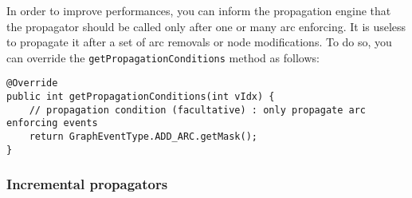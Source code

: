 \documentclass{article}
\begin{document}
In order to improve performances, you can inform the propagation engine that the propagator should be called only after one or many arc enforcing. It is useless to propagate it after a set of arc removals or node modifications. 
To do so, you can override the \texttt{getPropagationConditions} method as follows:
\begin{lstlisting}
@Override
public int getPropagationConditions(int vIdx) {
	// propagation condition (facultative) : only propagate arc enforcing events
	return GraphEventType.ADD_ARC.getMask();
}
\end{lstlisting}

\subsubsection{Incremental propagators}
\end{document}
